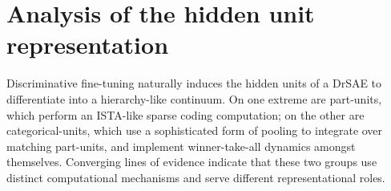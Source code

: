 \documentclass{article} %
\begin{document}
\begin{comment}
DrSAEs are similar to LISTA~\citep{gregor2010}, although we use non-negative hidden units and train using a different loss function.  
The unsupervised loss function of equation~\ref{reconstruction-loss} corresponds to that of Sprechmann and colleagues' LISTA auto-encoders~\citep{sprechmann2012a, sprechmann2012b}, but we use an explicit feedforward classifier, and discriminatively train a common set of parameters for all classes. 
DrSAEs also resemble the structure of deep sparse rectifier neural networks \citep{glorot2011}, but differ in that the parameter matrices at each layer are tied, the input projects to all layers, and the outputs are normalized.  %
In all three cases, these are critical properties necessary to induce a hierarchical representation, %
and we achieve superior classification performance to these established methods.
\end{comment}



\section{Analysis of the hidden unit representation} %

Discriminative fine-tuning naturally induces the hidden units of a DrSAE to differentiate into a hierarchy-like continuum.  On one extreme are part-units, which perform an ISTA-like sparse coding computation; on the other are categorical-units, which use a sophisticated form of pooling to integrate %
over matching part-units, %
and implement winner-take-all dynamics amongst themselves.  Converging lines of evidence indicate that these two groups use distinct computational mechanisms and serve different representational roles.  
\end{document}
